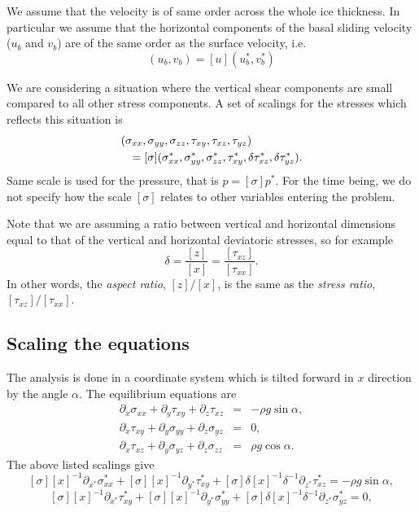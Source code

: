 \documentclass[10pt,a4paper]{book}
\newcommand{\p}{\partial}
\newcommand{\de}{\delta}
\newcommand{\exx}{\dot{\epsilon}_{xx}}
\newcommand{\txy}{\tau_{xy}}
\newcommand{\txz}{\tau_{xz}}
\newcommand{\tyz}{\tau_{yz}}
\newcommand{\sxx}{\sigma_{xx}}
\newcommand{\syy}{\sigma_{yy}}
\newcommand{\szz}{\sigma_{zz}}
\begin{document}
We assume that the velocity is of same order across the whole ice thickness. In particular we assume
that the horizontal components of the basal sliding velocity ($u_b$ and $v_b$) are of the
same order as the surface velocity, i.e.\
\begin{equation}
(u_b,v_b)=[u] (u_b^*,v_b^*)
\label{eq:ubscaled}
\end{equation}



We are considering a situation where the vertical shear components are
small compared to all other stress components. A set of scalings for
the stresses which reflects this situation is
\begin{eqnarray}
\lefteqn{(\sxx,\syy,\szz,\txy,\txz,\tyz)}\nonumber \\
& & =[\sigma] (\sxx^*,\syy^*,\szz^*,\txy^*,\de \txz^*, \de \tyz^*).
\label{eq:scal}
\end{eqnarray}
Same scale is used for the pressure, that is $p=[\sigma] p^*$. For the time being, we
do not specify how the scale $[\sigma]$ relates to other variables entering the problem.


Note that we are assuming a ratio between vertical and horizontal dimensions equal to that of the
vertical and horizontal deviatoric stresses, so for example
\[
\de=\frac{[z]}{[x]}=\frac{[\tau_{xz}]}{[\tau_{xx}]} .
\]
In other words, the {\em aspect ratio}, $[z]/[x]$, is the same as the {\em stress ratio},
$[\tau_{xz}]/[\tau_{xx}]$.

\subsection{Scaling the equations}

The analysis is done in a coordinate system which is tilted forward in
$x$ direction by the angle $\alpha$. The equilibrium equations are
\begin{eqnarray*}
\p_{x} \sxx+\p_{y} \txy + \p_{z} \txz &=& -\rho g \sin \alpha,\\
\p_{x} \txy+\p_{y} \syy + \p_{z} \sigma_{yz} &=& 0 ,\\
\p_{x} \txz+\p_{y}\sigma_{yz} + \p_{z} \szz &=& \rho g \cos \alpha.
\end{eqnarray*}
The above listed scalings give
\[
[\sigma] [x]^{-1} \p_{x^*} \sxx^*+[\sigma] [x]^{-1} \p_{y^*} \txy^* + 
[\sigma] \de [x]^{-1} \de^{-1} \p_{z^*} \txz^* =  -\rho g \sin \alpha  , 
\]
\[ [\sigma] [x]^{-1} \p_{x^*} \txy^*+[\sigma] [x]^{-1} \p_{y^*} \syy^* + 
[\sigma] \de [x]^{-1} \de^{-1} \p_{z^*} \sigma_{yz}^* = 0 , 
\]
\end{document}
